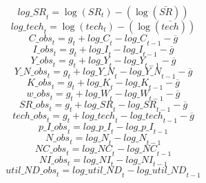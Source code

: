\begin{dmath}
{log\_SR}_{t}=\log\left({{SR}}_{t}\right)-(\log\left(\bar{{SR}}\right))
\end{dmath}
\begin{dmath}
{log\_tech}_{t}=\log\left({{tech}}_{t}\right)-(\log\left(\bar{{tech}}\right))
\end{dmath}
\begin{dmath}
{C\_obs}_{t}={{g}}_{t}+{log\_C}_{t}-{log\_C}_{t-1}-{{\overline{g}}}
\end{dmath}
\begin{dmath}
{I\_obs}_{t}={{g}}_{t}+{log\_I}_{t}-{log\_I}_{t-1}-{{\overline{g}}}
\end{dmath}
\begin{dmath}
{Y\_obs}_{t}={{g}}_{t}+{log\_Y}_{t}-{log\_Y}_{t-1}-{{\overline{g}}}
\end{dmath}
\begin{dmath}
{Y\_N\_obs}_{t}={{g}}_{t}+{log\_Y\_N}_{t}-{log\_Y\_N}_{t-1}-{{\overline{g}}}
\end{dmath}
\begin{dmath}
{K\_obs}_{t}={{g}}_{t}+{log\_K}_{t}-{log\_K}_{t-1}-{{\overline{g}}}
\end{dmath}
\begin{dmath}
{w\_obs}_{t}={{g}}_{t}+{log\_W}_{t}-{log\_W}_{t-1}-{{\overline{g}}}
\end{dmath}
\begin{dmath}
{SR\_obs}_{t}={{g}}_{t}+{log\_SR}_{t}-{log\_SR}_{t-1}-{{\overline{g}}}
\end{dmath}
\begin{dmath}
{tech\_obs}_{t}={{g}}_{t}+{log\_tech}_{t}-{log\_tech}_{t-1}-{{\overline{g}}}
\end{dmath}
\begin{dmath}
{p\_I\_obs}_{t}={log\_p\_I}_{t}-{log\_p\_I}_{t-1}
\end{dmath}
\begin{dmath}
{N\_obs}_{t}={log\_N}_{t}-{log\_N}_{t-1}
\end{dmath}
\begin{dmath}
{NC\_obs}_{t}={log\_NC}_{t}-{log\_NC}_{t-1}
\end{dmath}
\begin{dmath}
{NI\_obs}_{t}={log\_NI}_{t}-{log\_NI}_{t-1}
\end{dmath}
\begin{dmath}
{util\_ND\_obs}_{t}={log\_util\_ND}_{t}-{log\_util\_ND}_{t-1}
\end{dmath}
